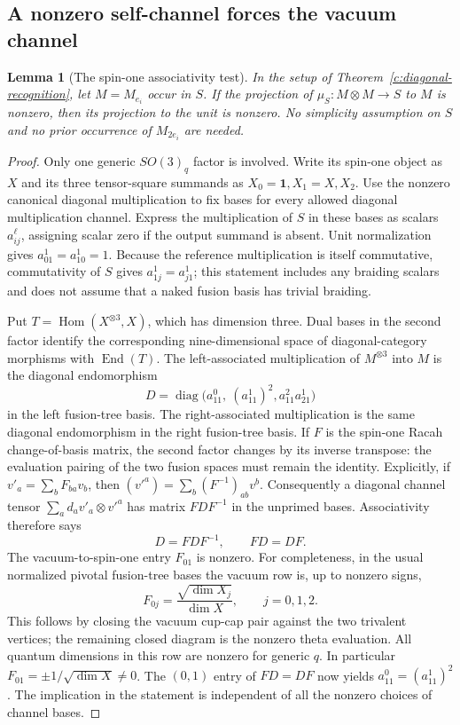 \documentclass[11pt,a4paper]{article}
\numberwithin{equation}{section}
\newtheorem{lemma}[theorem]{Lemma}
\theoremstyle{definition}\newtheorem{definition}[theorem]{Definition}
\theoremstyle{remark}\newtheorem{remark}[theorem]{Remark}
\begin{document}
\subsection{A nonzero self-channel forces the vacuum channel}

\begin{lemma}[The spin-one associativity test]\label{c:spin-one-vacuum}
In the setup of Theorem~\ref{c:diagonal-recognition}, let $M=M_{e_i}$ occur in
$S$.  If the projection of $\mu_S:M\otimes M\to S$ to $M$ is nonzero,
then its projection to the unit is nonzero.  No simplicity assumption on
$S$ and no prior occurrence of $M_{2e_i}$ are needed.
\end{lemma}
\begin{proof}
Only one generic $SO(3)_q$ factor is involved.  Write its spin-one object as
$X$ and its three tensor-square summands as $X_0=\mathbf1,X_1=X,X_2$.
Use the nonzero canonical diagonal multiplication to fix bases for every
allowed diagonal multiplication channel.  Express the multiplication of
$S$ in these bases as scalars $a_{ij}^{\ell}$, assigning scalar zero if the
output summand is absent.  Unit normalization gives $a_{01}^1=a_{10}^1=1$.
Because the reference multiplication is itself commutative, commutativity
of $S$ gives $a_{1j}^1=a_{j1}^1$; this statement includes any braiding
scalars and does not assume that a naked fusion basis has trivial braiding.

Put $T=\operatorname{Hom}(X^{\otimes3},X)$, which has dimension three.
Dual bases in the second factor identify the corresponding nine-dimensional
space of diagonal-category morphisms with $\operatorname{End}(T)$.
The left-associated multiplication of $M^{\otimes3}$ into $M$ is the
diagonal endomorphism
\[
 D=\operatorname{diag}\bigl(a_{11}^0,\ (a_{11}^1)^2,
                                      a_{11}^2a_{21}^1\bigr)
\]
in the left fusion-tree basis.  The right-associated multiplication is the
same diagonal endomorphism in the right fusion-tree basis.  If $F$ is the
spin-one Racah change-of-basis matrix, the second factor changes
by its inverse transpose: the evaluation pairing of the two
fusion spaces must remain the identity. Explicitly, if
$v'_a=\sum_bF_{ba}v_b$, then
$(v'^a)=\sum_b(F^{-1})_{ab}v^b$.
Consequently a diagonal channel tensor
$\sum_a d_av'_a\otimes v'^a$ has matrix $FDF^{-1}$ in the
unprimed bases. Associativity therefore says
\[
 D=FDF^{-1},\qquad FD=DF.
\]
The vacuum-to-spin-one entry $F_{01}$ is nonzero.  For completeness, in the
usual normalized pivotal fusion-tree bases the vacuum row is, up to
nonzero signs,
\[
 F_{0j}=\frac{\sqrt{\dim X_j}}{\dim X},\qquad j=0,1,2.
\]
This follows by closing the vacuum cup-cap pair against the two trivalent
vertices; the remaining closed diagram is the nonzero theta evaluation.
All quantum dimensions in this row are nonzero for generic $q$.
In particular $F_{01}=\pm1/\sqrt{\dim X}\ne0$.
The $(0,1)$ entry of $FD=DF$ now yields
$a_{11}^0=(a_{11}^1)^2$.  The implication in the statement is independent
of all the nonzero choices of channel bases.
\end{proof}
\end{document}
